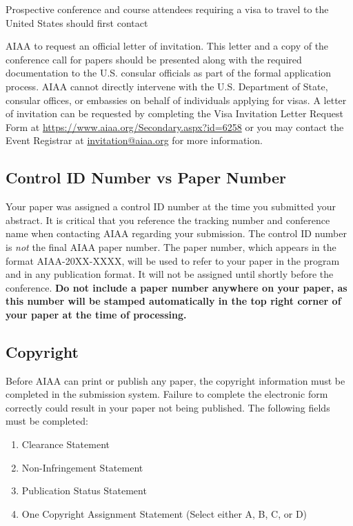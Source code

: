 \documentclass[conf]{new-aiaa}
\begin{document}
Prospective conference and course attendees requiring a visa to travel to the United States should first contact

AIAA to request an official letter of invitation. This letter and a copy of the conference call for papers should be presented along with the required documentation to the U.S. consular officials as part of the formal application process.  AIAA cannot directly intervene with the U.S. Department of State, consular offices, or embassies on behalf of individuals applying for visas. A letter of invitation can be requested by completing the Visa Invitation Letter Request Form at \url{https://www.aiaa.org/Secondary.aspx?id=6258} or you may contact the Event Registrar at \url{invitation@aiaa.org} for more information.

\subsection{Control ID Number vs Paper Number}

Your paper was assigned a control ID number at the time you submitted your abstract. It is critical that you reference the tracking number and conference name when contacting AIAA regarding your submission. The control ID number is \emph{not} the final AIAA paper number. The paper number, which appears in the format AIAA-20XX-XXXX, will be used to refer to your paper in the program and in any publication format. It will not be assigned until shortly before the conference. \textbf{Do not include a paper number anywhere on your paper, as this number will be stamped automatically in the top right corner of your paper at the time of processing.}

\subsection{Copyright}

Before AIAA can print or publish any paper, the copyright information must be completed in the submission system. Failure to complete the electronic form correctly could result in your paper not being published. The following fields must be completed:

\begin{enumerate}
\item Clearance Statement
\item Non-Infringement Statement
\item Publication Status Statement
\item One Copyright Assignment Statement (Select either A, B, C, or D)
\end{enumerate}
\end{document}
